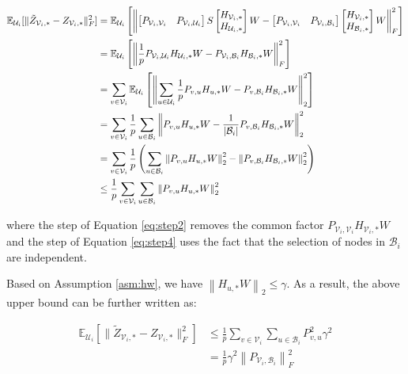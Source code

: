 \documentclass{article}
\newcommand{\expe}{\mathbb{E}}
\begin{document}
\begin{align}
\expe_{\mathcal{U}_i}[\|\tilde{Z}_{\mathcal{V}_i,*}-Z_{\mathcal{V}_i,*}\|_F^2]
	& =\expe_{\mathcal{U}_i}\left[\left\|
\begin{bmatrix}
P_{\mathcal{V}_i,\mathcal{V}_i} & P_{\mathcal{V}_i,\mathcal{U}_i}
\end{bmatrix}
S
\begin{bmatrix}
H_{\mathcal{V}_i,*}\\
H_{\mathcal{U}_i,*}
\end{bmatrix}W
-
\begin{bmatrix}
P_{\mathcal{V}_i,\mathcal{V}_i} & P_{\mathcal{V}_i,\mathcal{B}_i}
\end{bmatrix}
\begin{bmatrix}
H_{\mathcal{V}_i,*} \\
H_{\mathcal{B}_i,*}
\end{bmatrix}W
		\right\|_F^2\right]  \notag\\
	& =\expe_{\mathcal{U}_i}\left[\left\|\frac{1}{p}P_{\mathcal{V}_i,\mathcal{U}_i}H_{\mathcal{U}_i,*}W-P_{\mathcal{V}_i,\mathcal{B}_i}H_{\mathcal{B}_i,*}W\right\|_F^2\right]  \label{eq:step2}\\
	& =\sum_{v\in\mathcal{V}_i}\expe_{\mathcal{U}_i}\left[\left\|\sum_{u\in\mathcal{U}_i}\frac{1}{p}P_{v,u}H_{u,*}W-P_{v,\mathcal{B}_i}H_{\mathcal{B}_i,*}W\right\|_2^2\right]  \notag\\
	& =\sum_{v\in\mathcal{V}_i}\frac{1}{p}\sum_{u\in\mathcal{B}_i}\left\|P_{v,u}H_{u,*}W-\frac{1}{|\mathcal{B}_i|}P_{v,\mathcal{B}_i}H_{\mathcal{B}_i,*}W\right\|_2^2 \label{eq:step4}\\
	& =\sum_{v\in\mathcal{V}_i}\frac{1}{p}\left(\sum_{u\in\mathcal{B}_i}\left\|P_{v,u}H_{u,*}W\right\|_2^2-\left\|P_{v,\mathcal{B}_i}H_{\mathcal{B}_i,*}W\right\|_2^2\right) \notag\\
	& \leq\frac{1}{p}\sum_{v\in\mathcal{V}_i}\sum_{u\in\mathcal{B}_i}\left\|P_{v,u}H_{u,*}W\right\|_2^2 \notag
\end{align}

where the step of Equation \ref{eq:step2} removes the common factor $P_{\mathcal{V}_i,\mathcal{V}_i}H_{\mathcal{V}_i,*}W$ and the step of Equation \ref{eq:step4} uses the fact that the selection of nodes in $\mathcal{B}_i$ are independent.

Based on Assumption \ref{asm:hw}, we have $\left\|H_{u,*}W\right\|_2\leq\gamma$. As a result, the above upper bound can be further written as: 

\begin{align*}
\expe_{\mathcal{U}_i}[\|\tilde{Z}_{\mathcal{V}_i,*}-Z_{\mathcal{V}_i,*}\|_F^2]
	& \leq\frac{1}{p}\sum_{v\in\mathcal{V}_i}\sum_{u\in\mathcal{B}_i}P_{v,u}^2\gamma^2 \\
	&=\frac{1}{p}\gamma^2\left\|P_{\mathcal{V}_i,\mathcal{B}_i}\right\|_F^2
\end{align*}
\end{document}
